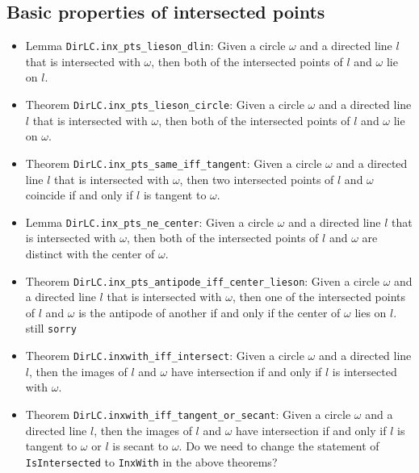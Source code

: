 \documentclass[12pt]{amsart}
\begin{document}
\subsection{Basic properties of intersected points}
\begin{itemize}
    \item Lemma \verb|DirLC.inx_pts_lieson_dlin|: Given a circle $\omega$ and a directed line $l$ that is intersected with $\omega$, then both of the intersected points of $l$ and $\omega$ lie on $l$.
    \item Theorem \verb|DirLC.inx_pts_lieson_circle|: Given a circle $\omega$ and a directed line $l$ that is intersected with $\omega$, then both of the intersected points of $l$ and $\omega$ lie on $\omega$.
    \item Theorem \verb|DirLC.inx_pts_same_iff_tangent|: Given a circle $\omega$ and a directed line $l$ that is intersected with $\omega$, then two intersected points of $l$ and $\omega$ coincide if and only if $l$ is tangent to $\omega$.
    \item Lemma \verb|DirLC.inx_pts_ne_center|: Given a circle $\omega$ and a directed line $l$ that is intersected with $\omega$, then both of the intersected points of $l$ and $\omega$ are distinct with the center of $\omega$.
    \item Theorem \verb|DirLC.inx_pts_antipode_iff_center_lieson|: Given a circle $\omega$ and a directed line $l$ that is intersected with $\omega$, then one of the intersected points of $l$ and $\omega$ is the antipode of another if and only if the center of $\omega$ lies on $l$. {\color{red} still \verb|sorry|}
    \item Theorem \verb|DirLC.inxwith_iff_intersect|: Given a circle $\omega$ and a directed line $l$, then the images of $l$ and $\omega$ have intersection if and only if $l$ is intersected with $\omega$.
    \item Theorem \verb|DirLC.inxwith_iff_tangent_or_secant|: Given a circle $\omega$ and a directed line $l$, then the images of $l$ and $\omega$ have intersection if and only if $l$ is tangent to $\omega$ or $l$ is secant to $\omega$.
    {\color{red} Do we need to change the statement of \verb|IsIntersected| to \verb|InxWith| in the above theorems?}
\end{itemize}
\end{document}
